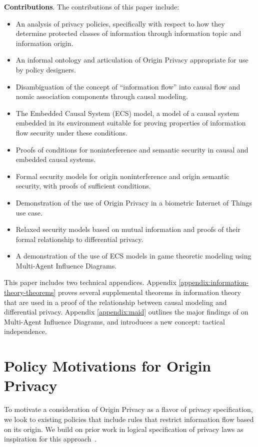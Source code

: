 \documentclass[../thesis.tex]{subfiles}
\begin{document}
\textbf{Contributions}. The contributions of this paper
include:
\begin{itemize}
\item An analysis of privacy policies, specifically with
  respect to how they determine protected classes of information
  through information topic and information origin.
\item An informal ontology and articulation of Origin Privacy
  appropriate for use by policy designers.
\item Disambiguation of the concept of ``information flow''
  into causal flow and nomic association components through
  causal modeling.
\item The Embedded Causal System (ECS) model, a model of a
  causal system embedded in its environment suitable for
  proving properties of information flow security under these
  conditions.
\item Proofs of conditions for noninterference and semantic security
  in causal and embedded causal systems.
\item Formal security models for origin noninterference and origin
  semantic security, with proofs of sufficient conditions.
\item Demonstration of the use of Origin Privacy in a
  biometric Internet of Things use case.
\item Relaxed security models based on mutual information and
  proofs of their formal relationship to differential privacy.
\item A demonstration of the use of ECS models in game theoretic
  modeling using Multi-Agent Influence Diagrams.
\end{itemize}

This paper includes two technical appendices.
Appendix \ref{appendix:information-theory-theorems}
proves several supplemental theorems in information theory
that are used in a proof of the relationship between
causal modeling and differential privacy.
Appendix \ref{appendix:maid} outlines the major
findings of \cite{koller2003multi} on Multi-Agent
Influence Diagrams, and introduces a new concept:
tactical independence.

\section{Policy Motivations for Origin Privacy}
\label{sec:policy}

To motivate a consideration of Origin Privacy as a flavor
of privacy specification, we look to existing policies that
include rules that restrict information flow based on its origin.
We build on prior work in logical specification of privacy
laws as inspiration for this 
approach~\cite{barth06sp,DeYoungGJKD10}.
\end{document}
